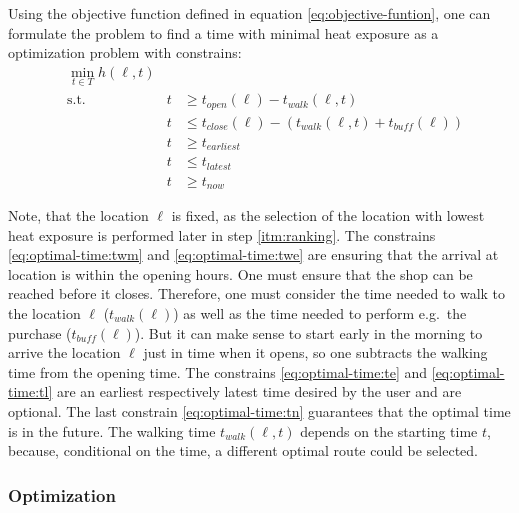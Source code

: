 Using the objective function defined in equation \eqref{eq:objective-funtion}, one can formulate the problem to find a time with minimal heat exposure as a optimization problem with constrains:
\begin{subequations}
	\label{eq:optimal-time}
	\begin{alignat}{2}
	&\min_{t \in T} h(\ell, t) && \label{eq:optimal-time:of} \\
	&\text{s.t.} & t & \geq t_{open}(\ell)-t_{walk}(\ell, t) \label{eq:optimal-time:twm}\\
	&	& t & \leq   t_{close}(\ell)-(t_{walk}(\ell, t)+t_{buff}(\ell))	\label{eq:optimal-time:twe}\\
	&	&  t & \geq t_{earliest} \label{eq:optimal-time:te} \\
	&	&  t & \leq t_{latest} \label{eq:optimal-time:tl} \\
	&  & t  & \geq t_{now} \label{eq:optimal-time:tn} 
	\end{alignat}
\end{subequations}

Note, that the location $\ell$ is fixed, as the selection of the location with lowest heat exposure is performed later in step \ref{itm:ranking}. The constrains \eqref{eq:optimal-time:twm} and \eqref{eq:optimal-time:twe} are ensuring that the arrival at location is within the opening hours. One must ensure that the shop can be reached before it closes. Therefore, one must consider the time needed to walk to the location $\ell$ ($t_{walk}(\ell)$) as well as the time needed to perform e.g.\ the purchase ($t_{buff}(\ell)$). But it can make sense to start early in the morning to arrive the location $\ell$ just in time when it opens, so one subtracts the walking time from the opening time. The constrains \eqref{eq:optimal-time:te} and \eqref{eq:optimal-time:tl} are an earliest respectively latest time desired by the user and are optional. The last constrain  \eqref{eq:optimal-time:tn}  guarantees that the optimal time is in the future. The walking time $t_{walk}(\ell, t)$ depends on the starting time $t$, because, conditional on the time, a different optimal route could be selected.

 \subsubsection{Optimization \label{sec:optimization}}
 
